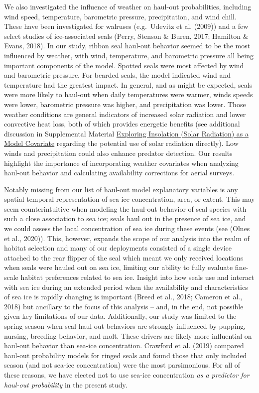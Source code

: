 \documentclass[fleqn,10pt,lineno]{wlpeerj} %
\begin{document}
We also investigated the influence of weather on haul-out probabilities,
including wind speed, temperature, barometric pressure, precipitation, and wind
chill. These have been investigated for walruses (e.g.~Udevitz et al.
(2009)) and a few select studies of ice-associated seals
(Perry, Stenson \& Buren, 2017; Hamilton \& Evans, 2018). In our study, ribbon seal haul-out behavior seemed to be the most
influenced by weather, with wind, temperature, and barometric pressure all being
important components of the model. Spotted seals were most affected by wind and
barometric pressure. For bearded seals, the model indicated wind and temperature
had the greatest impact. In general, and as might be expected, seals were more
likely to haul-out when daily temperatures were warmer, winds speeds were lower,
barometric pressure was higher, and precipitation was lower. Those weather
conditions are general indicators of increased solar radiation and lower
convective heat loss, both of which provides energetic benefits (see additional
discussion in Supplemental Material \hyperref[exploring-insolation-solar-radiation-as-a-model-covariate]{Exploring Insolation (Solar Radiation) as a
Model Covariate} regarding the potential use of solar radiation directly). Low
winds and precipitation could also enhance predator detection. Our results
highlight the importance of incorporating weather covariates when analyzing
haul-out behavior and calculating availability corrections for aerial surveys.

Notably missing from our list of haul-out model explanatory variables is any
spatial-temporal representation of sea-ice concentration, area, or extent. This
may seem counterintuitive when modeling the haul-out behavior of seal species
with such a close association to sea ice; seals haul out in the presence of sea
ice, and we could assess the local concentration of sea ice during these events
(see (Olnes et al., 2020)). This, however, expands the scope of our analysis into the
realm of habitat selection and many of our deployments consisted of a single
device attached to the rear flipper of the seal which meant we only received
locations when seals were hauled out on sea ice, limiting our ability to fully
evaluate fine-scale habitat preferences related to sea ice. Insight into how
seals use and interact with sea ice during an extended period when the
availability and characteristics of sea ice is rapidly changing is important
(Breed et al., 2018; Cameron et al., 2018) but ancillary to the focus of this analysis -- and,
in the end, not possible given key limitations of our data. Additionally, our
study was limited to the spring season when seal haul-out behaviors are strongly
influenced by pupping, nursing, breeding behavior, and molt. These drivers are
likely more influential on haul-out behavior than sea-ice concentration.
Crawford et al. (2019) compared haul-out probability models for ringed
seals and found those that only included season (and not sea-ice concentration)
were the most parsimonious. For all of these reasons, we have elected not to use
sea-ice concentration \emph{as a predictor for haul-out probability} in the present
study.
\end{document}
